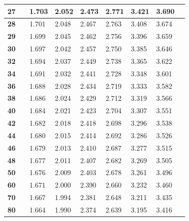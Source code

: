 \begin{alternateColorTable}
\begin{longtable}{|l|l l|l|l|l|l|l|l|}
    \textbf{27} & & 1.703 & 2.052 & 2.473 & 2.771 & 3.421 & 3.690\\ \hline
    
    \textbf{28} & & 1.701 & 2.048 & 2.467 & 2.763 & 3.408 & 3.674\\ \hline
    
    \textbf{29} & & 1.699 & 2.045 & 2.462 & 2.756 & 3.396 & 3.659\\ \hline
    
    \textbf{30} & & 1.697 & 2.042 & 2.457 & 2.750 & 3.385 & 3.646\\ \hline
    
    \textbf{32} & & 1.694 & 2.037 & 2.449 & 2.738 & 3.365 & 3.622\\ \hline
    
    \textbf{34} & & 1.691 & 2.032 & 2.441 & 2.728 & 3.348 & 3.601\\ \hline
    
    \textbf{36} & & 1.688 & 2.028 & 2.434 & 2.719 & 3.333 & 3.582\\ \hline
    
    \textbf{38} & & 1.686 & 2.024 & 2.429 & 2.712 & 3.319 & 3.566\\ \hline
    
    \textbf{40} & & 1.684 & 2.021 & 2.423 & 2.704 & 3.307 & 3.551\\ \hline
    
    \textbf{42} & & 1.682 & 2.018 & 2.418 & 2.698 & 3.296 & 3.538\\ \hline
    
    \textbf{44} & & 1.680 & 2.015 & 2.414 & 2.692 & 3.286 & 3.526\\ \hline
    
    \textbf{46} & & 1.679 & 2.013 & 2.410 & 2.687 & 3.277 & 3.515\\ \hline
    
    \textbf{48} & & 1.677 & 2.011 & 2.407 & 2.682 & 3.269 & 3.505\\ \hline
    
    \textbf{50} & & 1.676 & 2.009 & 2.403 & 2.678 & 3.261 & 3.496\\ \hline
    
    \textbf{60} & & 1.671 & 2.000 & 2.390 & 2.660 & 3.232 & 3.460\\ \hline
    
    \textbf{70} & & 1.667 & 1.994 & 2.381 & 2.648 & 3.211 & 3.435\\ \hline
    
    \textbf{80} & & 1.664 & 1.990 & 2.374 & 2.639 & 3.195 & 3.416\\ \hline
    

\end{longtable}
\end{alternateColorTable}
